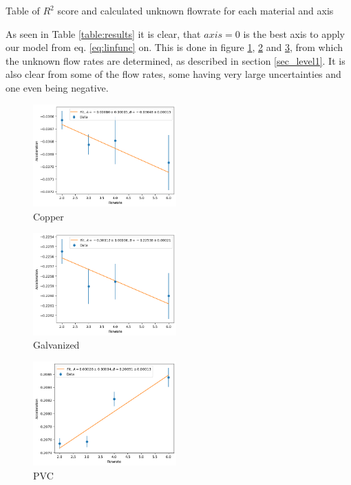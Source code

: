 \begin{table}[h!]
\resizebox{\columnwidth}{!}{%

}
\caption{Table of $R^2$ score and calculated unknown flowrate for each material and axis}
\label{table:results}
\end{table}
As seen in Table \ref{table:results} it is clear, that $axis = 0$ is the best axis to apply our model from eq. \ref{eq:linfunc} on. This is done in figure \ref{fig:copper}, \ref{fig:galvanized} and \ref{fig:PVC}, from which the unknown flow rates are determined, as described in section \ref{sec_level1}. It is also clear from some of the flow rates, some having very large uncertainties and one even being negative.


\begin{figure}[h!]
    \centering
    \includegraphics[width=55mm]
    {Python/Lab6/Plots/copper_axis0.png}
    \caption{Copper} 
    \label{fig:copper}
\end{figure}

\begin{figure}[h!]
    \centering
    \includegraphics[width=55mm]
    {Python/Lab6/Plots/galvanized_axis0.png}
    \caption{Galvanized} 
    \label{fig:galvanized}
\end{figure}
  
\begin{figure}[h!]
    \centering
    \includegraphics[width=55mm]
    {Python/Lab6/Plots/pvc_axis0.png}
    \caption{PVC} 
    \label{fig:PVC}
\end{figure}

  





